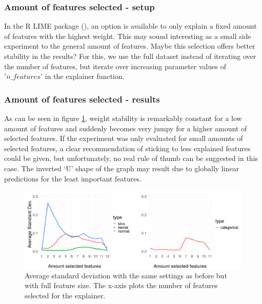 \documentclass[]{krantz}
\begin{document}
\subsubsection{Amount of features selected -
setup}\label{amount-of-features-selected---setup}

In the R LIME package (\citet{thomasp85lime}), an option is available to
only explain a fixed amount of features with the highest weight. This
may sound interesting as a small side experiment to the general amount
of features. Maybe this selection offers better stability in the
results? For this, we use the full dataset instead of iterating over the
number of features, but iterate over increasing parameter values of
\('n\_features'\) in the explainer function.

\subsubsection{Amount of features selected -
results}\label{amount-of-features-selected---results}

As can be seen in figure \ref{fig:figsdnfeat}, weight stability is
remarkably constant for a low amount of features and suddenly becomes
very jumpy for a higher amount of selected features. If the experiment
was only evaluated for small amounts of selected features, a clear
recommendation of sticking to less explained features could be given,
but unfortunately, no real rule of thumb can be suggested in this case.
The inverted `U' shape of the graph may result due to globally linear
predictions for the least important features.

\begin{figure}

{\centering \includegraphics[width=0.99\linewidth]{images/sd_nfeat_presi3} 

}

\caption{Average standard deviation with the same settings as before but with full feature size. The x-axis plots the number of features selected for the explainer.}\label{fig:figsdnfeat}
\end{figure}
\end{document}
